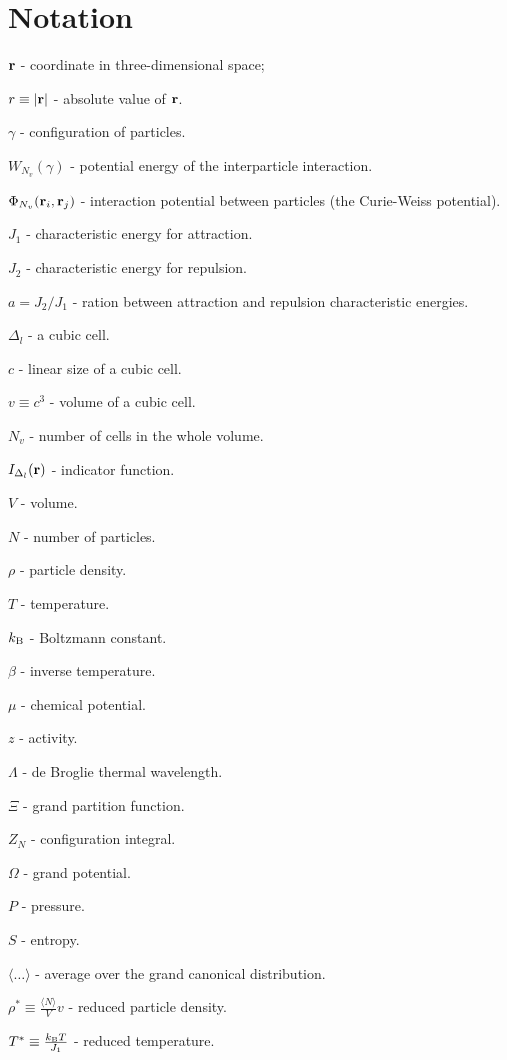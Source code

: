 \section{Notation}

$\vb r$ - coordinate in three-dimensional space;

$r \equiv \abs{\vb r}$ - absolute value of $\vb r$.

$\gamma$ - configuration of particles.

$W_{N_v}(\gamma)$ - potential energy of the interparticle interaction.

$\Phi_{N_v}(\vb{r}_i, \vb{r}_j)$ - interaction potential between particles (the Curie-Weiss potential).

$J_1$ - characteristic energy for attraction.

$J_2$ - characteristic energy for repulsion.

$a=J_2/J_1$ - ration between attraction and repulsion characteristic energies.

$\Delta_{l}$ - a cubic cell.

$c$ - linear size of a cubic cell.

$v \equiv c^3$ - volume of a cubic cell.

$N_v$ - number of cells in the whole volume.

$I_{\Delta_l} (\vb{r})$ - indicator function.

$V$ - volume.

$N$ - number of particles.

$\rho$ - particle density.

$T$ - temperature.

$k_{\rm B}$ - Boltzmann constant.

$\beta$ - inverse temperature.

$\mu$ - chemical potential.

$z$ - activity.

$\Lambda$ - de Broglie thermal wavelength.

$\Xi$ - grand partition function.

$Z_N$ - configuration integral.

$\Omega$ - grand potential.

$P$ - pressure.

$S$ - entropy.

$\langle\ldots\rangle$ - average over the grand canonical distribution.

$\rho^* \equiv \frac{\langle N \rangle}{V}v$ - reduced particle density.

$T^* \equiv \frac{k_{\rm B}T}{J_1}$ - reduced temperature.

